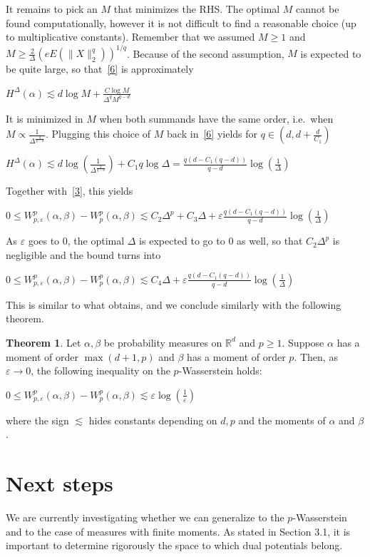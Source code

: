 \documentclass[12pt]{report}
\theoremstyle{definition}
\newtheorem{thm}[defi]{Theorem}
\theoremstyle{remark}
\begin{document}
It remains to pick an $M$ that minimizes the RHS. The optimal $M$ cannot be found computationally, however it is not difficult to find a reasonable choice (up to multiplicative constants). Remember that we assumed $M\geq 1$ and $\displaystyle M\geq \frac{2}{\Delta}\left(eE(\|X\|_2^q) \right)^{1/q}$. Because of the second assumption, $M$ is expected to be quite large, so that~\eqref{6} is approximately \begin{center}
	$H^{\Delta}(\alpha)\lesssim d \log M  + \frac {C\log M}{\Delta^q M^{q-d}}$
\end{center}
It is minimized in $M$ when both summands have the same order, i.e.\ when $M\propto \frac{1}{\Delta^{\frac q{q-d}}}$. Plugging this choice of $M$ back in~\eqref{6} yields for $q\in (d,d+\frac d{C_1})$ \begin{center}
	$H^{\Delta}(\alpha)\lesssim d \log\left(\frac{1}{\Delta^{\frac q{q-d}}} \right)  + C_1 q \log \Delta = \frac{q(d-C_1(q-d))}{q-d} \log\left(\frac 1\Delta\right)$
\end{center}
Together with~\eqref{3}, this yields \begin{center}
	$0 \leqslant W_{p,\varepsilon}^p(\alpha, \beta)-W_p^p(\alpha, \beta) \lesssim C_2 \Delta^p + C_3 \Delta + \varepsilon \frac{q(d-C_1(q-d))}{q-d} \log\left(\frac 1\Delta\right)$ 
\end{center}
As $\varepsilon$ goes to $0$, the optimal $\Delta$ is expected to go to $0$ as well, so that $C_2 \Delta^p$ is negligible and the bound turns into
\begin{center}
	$0 \leqslant W_{p,\varepsilon}^p(\alpha, \beta)-W_p^p(\alpha, \beta) \lesssim C_4 \Delta + \varepsilon \frac{q(d-C_1(q-d))}{q-d} \log\left(\frac 1\Delta\right)$ 
\end{center}

This is similar to what \cite{genevay2018sample} obtains, and we conclude similarly with the following theorem.

\begin{thm}\label{thmgen}
	Let $\alpha,\beta$ be probability measures on $\mathbb R^d$ and $p\geq 1$. Suppose $\alpha$ has a moment of order $\max(d+1,p)$ and $\beta$ has a moment of order $p$. Then, as $\varepsilon\to 0$, the following inequality on the $p$-Wasserstein holds: 
	\begin{center}
		$0 \leqslant W_{p,\varepsilon}^p(\alpha, \beta)-W_p^p(\alpha, \beta) \lesssim \varepsilon \log\left(\frac 1{\varepsilon} \right)$
	\end{center}
	where the sign $\lesssim$ hides constants depending on $d, p$ and the moments of $\alpha$ and $\beta$.
\end{thm}


\section{Next steps}

\hspace{\parindent} We are currently investigating whether we can generalize \cite{mena2019statistical} to the $p$-Wasserstein and to the case of measures with finite moments. As stated in Section 3.1, it is important to determine rigorously the space to which dual potentials belong.

\newpage 


\end{document}
